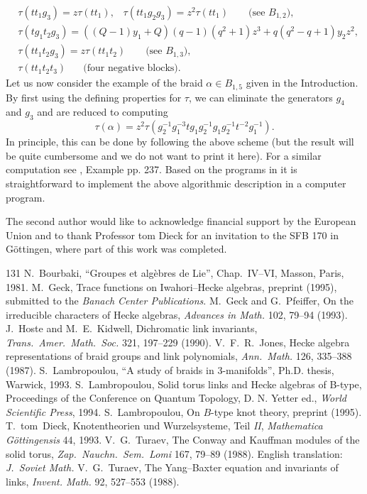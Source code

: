 \begin{exmp}
{\[\begin{array}{cl}
& \tau(tt_1g_3)=z\tau(tt_1),\;\;\;\tau(tt_1g_2g_3)=z^2\tau(tt_1) 
\;\;\;\;\;\; \mbox{ (see $B_{1,2}$)},\\
& \tau(tg_1t_2g_3)=((Q-1)y_1+Q)(q-1)(q^2+1)z^3+q(q^2-q+1)y_2z^2,\\
& \tau(tt_1t_2g_3)=z\tau(tt_1t_2) \;\;\;\;\;\; \mbox{ (see $B_{1,3}$)},\\
& \tau(tt_1t_2t_3) \;\;\;\;\; \mbox{ (four negative blocks)}. \end{array}\]
Let us now consider the example of the braid $\alpha \in B_{1,5}$ given in
 the Introduction. By first using the defining properties for $\tau$, we can
eliminate the generators $g_4$ and $g_3$ and are reduced to computing \[\tau(\alpha)
=z^2\tau(g_2^{-1}g_1^{-3}tg_1g_2^{-1}g_1g_2^{-1}t^{-2}g_1^{-1}).\]
In principle, this can be done by following the above scheme (but the
result will be quite cumbersome and we do not want to print it here). For a 
similar computation see \cite{L2}, Example pp. 237. Based on the programs 
in \cite{GP} it is straightforward to implement the above algorithmic 
description in a computer program.} \end{exmp}

\bigbreak {} The second author would like 
to acknowledge financial support by the European Union and to thank 
Professor tom Dieck for an invitation to the SFB 170 in G\"{o}ttingen, 
where part of this work was completed. 

\begin{thebibliography}{131}
 {N.~Bourbaki}, ``Groupes et alg\`{e}bres de Lie'',
               Chap.\ IV--VI, Masson, Paris, 1981.
 {M.~Geck}, Trace functions on Iwahori--Hecke algebras,
              preprint (1995), submitted to the {\it Banach Center Publications}.
 {M.~Geck and G.~Pfeiffer}, On the irreducible characters of
             Hecke algebras, {\it Advances in Math.} 102, 79--94 (1993).
 {J.~Hoste and M.~E.~Kidwell},  Dichromatic link invariants, 
             {\it Trans.\ Amer.\ Math.\ Soc.} 321, 197--229 (1990).
 {V.~F.~R.~Jones},
               Hecke algebra representations of braid groups and link 
               polynomials, {\it Ann.\ Math.} 126, 335--388 (1987).
 {S.~Lambropoulou}, ``A study of braids in 3-manifolds'',
  Ph.D. thesis, Warwick, 1993.
 {S.~Lambropoulou}, Solid torus links and Hecke algebras of B-type,
            Proceedings of the Conference on Quantum Topology, D. N. Yetter ed.,
            {\it World Scientific Press}, 1994.
 {S.~Lambropoulou}, On $B$-type knot theory, preprint (1995).
 {T.~tom~Dieck}, Knotentheorien und Wurzelsysteme, Teil {\it II},
            {\it Mathematica G\"ottingensis} 44, 1993.   
 {V.~G.~Turaev}, The Conway and Kauffman modules of the solid 
            torus, {\it Zap.\ Nauchn.\ Sem.\ Lomi} 167, 79--89  (1988). English
             translation:  {\it J.\ Soviet Math.}
 {V.~G.~Turaev}, The Yang--Baxter equation and invariants of links, 
            {\it Invent. Math.} 92, 527--553  (1988). 
\end{thebibliography} 

